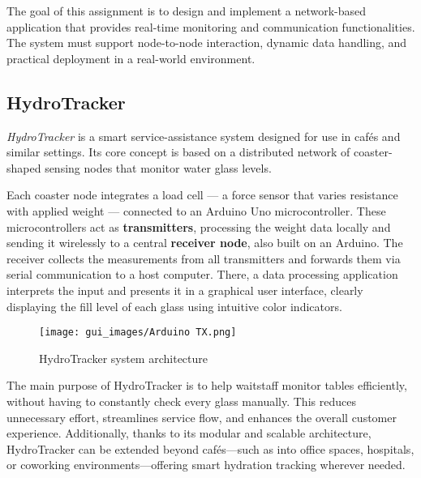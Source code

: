 The goal of this assignment is to design and implement a network-based application that provides real-time monitoring and communication functionalities. The system must support node-to-node interaction, dynamic data handling, and practical deployment in a real-world environment.

\subsection{HydroTracker}

\textit{HydroTracker} is a smart service-assistance system designed for use in cafés and similar settings. Its core concept is based on a distributed network of coaster-shaped sensing nodes that monitor water glass levels.

Each coaster node integrates a load cell — a force sensor that varies resistance with applied weight — connected to an Arduino Uno microcontroller. These microcontrollers act as \textbf{transmitters}, processing the weight data locally and sending it wirelessly to a central \textbf{receiver node}, also built on an Arduino. The receiver collects the measurements from all transmitters and forwards them via serial communication to a host computer. There, a data processing application interprets the input and presents it in a graphical user interface, clearly displaying the fill level of each glass using intuitive color indicators.

\begin{figure}[H]
    \centering
    \texttt{[image: gui\_images/Arduino TX.png]}
  \caption{HydroTracker system architecture}
  \label{fig:hydrotracker_architecture}
\end{figure}

The main purpose of HydroTracker is to help waitstaff monitor tables efficiently, without having to constantly check every glass manually. This reduces unnecessary effort, streamlines service flow, and enhances the overall customer experience. Additionally, thanks to its modular and scalable architecture, HydroTracker can be extended beyond cafés—such as into office spaces, hospitals, or coworking environments—offering smart hydration tracking wherever needed.